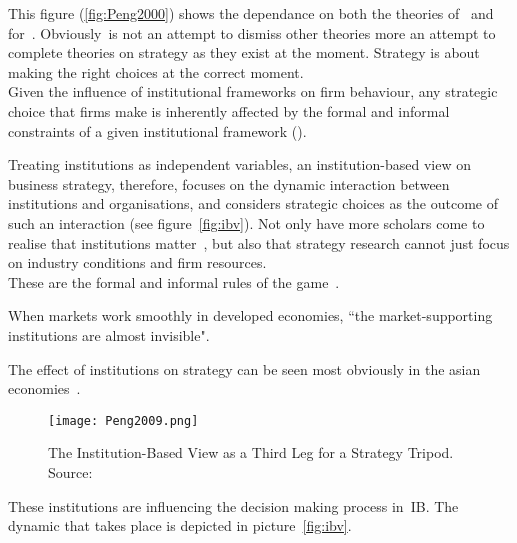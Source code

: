 


This figure (\ref{fig:Peng2000}) shows the dependance on both the theories of~\cite{Barney:2001} and~\cite{Porter:1980} for~\ibv. Obviously~\ibv is not an attempt to dismiss other theories more an attempt to complete theories on strategy as they exist at the moment. Strategy is about making the right choices at the correct moment. \\

Given the influence of institutional frameworks on firm behaviour, any strategic choice that firms make is inherently affected by the formal and informal constraints of a given institutional framework (\cite{North:1990,Oliver:1997}). 




Treating institutions as independent variables, an institution-based view on business strategy, therefore, focuses on the dynamic interaction between institutions and organisations, and considers strategic choices as the outcome of such an interaction (see figure~\ref{fig:ibv})\cite{Peng:2002}.
Not only have more scholars come to realise that institutions matter~\cite{Powell:1991,Scott:1995}, but also that strategy research cannot just focus on industry conditions and firm resources.~\cite{Khanna:1997}\\

These are the formal and informal rules of the game~\cite{North:1990}. 








When markets work smoothly in developed economies, ``the market-supporting institutions are almost invisible".~\cite{McMillan:2007}

The effect of institutions on strategy can be seen most obviously in the asian economies~\cite{Peng:2002}.

\begin{figure}[htbp!] 
      \label{fig:Peng2009}
	\centering
	\texttt{[image: Peng2009.png]}
 	\caption{The Institution-Based View as a Third Leg for a Strategy Tripod. Source:~\cite{Peng:2009}}
\end{figure}









These institutions are influencing the decision making process in~\gls{IB}.  The dynamic that takes place is depicted in picture~\ref{fig:ibv}. 


